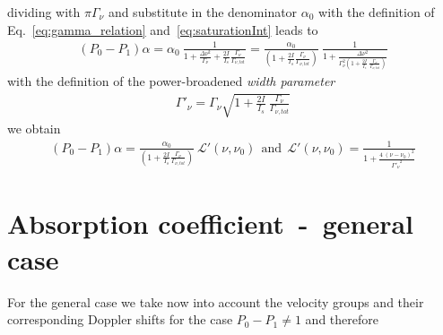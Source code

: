dividing with \(\pi\Gamma_\nu \) and substitute in the denominator \(\alpha_0 \) 
with the definition of Eq.~\eqref{eq:gamma_relation} and~\eqref{eq:saturationInt} 
leads to
\begin{align}
    (P_0-P_1)\alpha = \alpha_0~\frac{1}
    {1 + \frac{\Delta\nu^2}{\Gamma_\nu} + \frac{2I}{I_s}\frac{\Gamma_\nu}{\Gamma_{\nu,tot}} } 
    = \frac{\alpha_0}{(1 + \frac{2I}{I_s}\frac{\Gamma_\nu}{\Gamma_{\nu,tot}})}~
    \frac{1}{1+ \frac{\Delta\nu^2}
    {\Gamma_\nu^2 \left(1 + \frac{2I}{I_s}~\frac{\Gamma_\nu}{\Gamma_{\nu,tot}} \right)}}
\end{align}
with the definition of the power-broadened \textit{width parameter}
\begin{align}
    \Gamma'_\nu = \Gamma_\nu \sqrt{1 + \frac{2I}{I_s}~\frac{\Gamma_\nu}{\Gamma_{\nu,tot}} }
\end{align}
we obtain
\begin{align}
    (P_0-P_1)\alpha = 
    \frac{\alpha_0}{ \left( 1 + \frac{2I}{I_s}\frac{\Gamma_\nu}{\Gamma_{\nu,tot}} \right )}~
    \mathcal{L}'(\nu,\nu_0)~~\text{and}~~\mathcal{L}'(\nu,\nu_0)= 
    \frac{1}{1+ \frac{{4~(\nu-\nu_0)}^2}{{\Gamma'_\nu}^2}}
\end{align}
\pagebreak
\section{Absorption coefficient~-~general case}  %

For the general case we take now into account the velocity groups and their 
corresponding Doppler shifts for the case \(P_0-P_1 \neq 1 \) and therefore 

